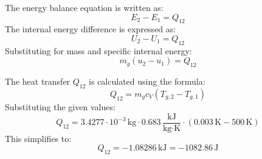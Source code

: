 The energy balance equation is written as:  
\[
E_2 - E_1 = Q_{12}
\]  
The internal energy difference is expressed as:  
\[
U_2 - U_1 = Q_{12}
\]  
Substituting for mass and specific internal energy:  
\[
m_g (u_2 - u_1) = Q_{12}
\]  

The heat transfer \( Q_{12} \) is calculated using the formula:  
\[
Q_{12} = m_g c_V (T_{g,2} - T_{g,1})
\]  
Substituting the given values:  
\[
Q_{12} = 3.4277 \cdot 10^{-3} \, \text{kg} \cdot 0.683 \, \frac{\text{kJ}}{\text{kg·K}} \cdot (0.003 \, \text{K} - 500 \, \text{K})
\]  
This simplifies to:  
\[
Q_{12} = -1.08286 \, \text{kJ} = -1082.86 \, \text{J}
\]
